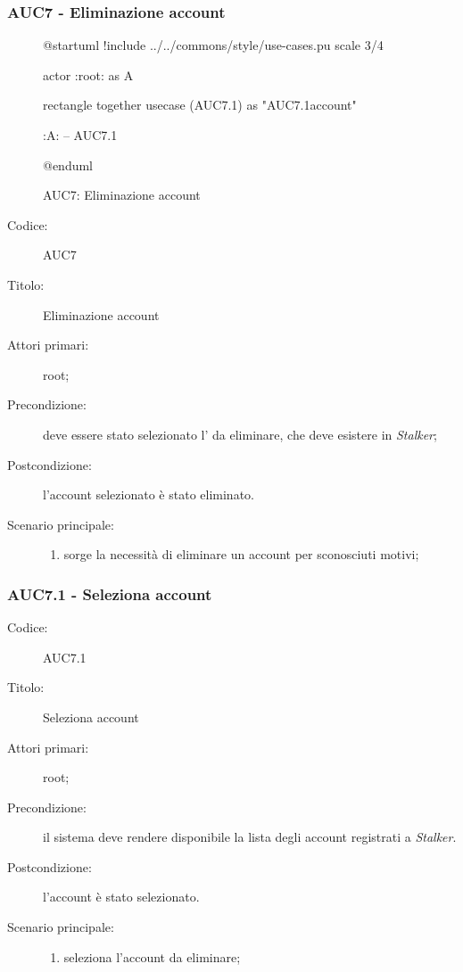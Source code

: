 \documentclass[casi-duso]{subfiles}
\begin{document}
\subsubsection{AUC7 - Eliminazione account}%
\label{subsub:AUC7}

\begin{figure}[h!]
  \centering
  \begin{plantuml}
  @startuml
  !include ../../commons/style/use-cases.pu
  scale 3/4

  actor :root: as A

  rectangle {
    together {
      usecase (AUC7.1) as "AUC7.1\nSeleziona account"
    }
  }

  :A: -- AUC7.1

  @enduml
  \end{plantuml}
  \caption{AUC7: Eliminazione account}
  \label{fig:auc7}
\end{figure}

\begin{description}
  \item[Codice:] AUC7
  \item[Titolo:] Eliminazione account
  \item[Attori primari:] root;
  \item[Precondizione:] deve essere stato selezionato l' da eliminare, che deve esistere in \emph{Stalker};
  \item[Postcondizione:] l'account selezionato è stato eliminato.
  \item[Scenario principale:]
  \begin{enumerate}
    \item sorge la necessità di eliminare un account per sconosciuti motivi;
  \end{enumerate}
\end{description}

\subsubsection{AUC7.1 - Seleziona account}%
\label{subsub:AUC7.1}
\begin{description}
  \item[Codice:] AUC7.1
  \item[Titolo:] Seleziona account
  \item[Attori primari:] root;
  \item[Precondizione:] il sistema deve rendere disponibile la lista degli account registrati a \emph{Stalker}.
  \item[Postcondizione:] l'account è stato selezionato.
  \item[Scenario principale:]
  \begin{enumerate}
    \item {} seleziona l'account da eliminare;
  \end{enumerate}
\end{description}
\end{document}

